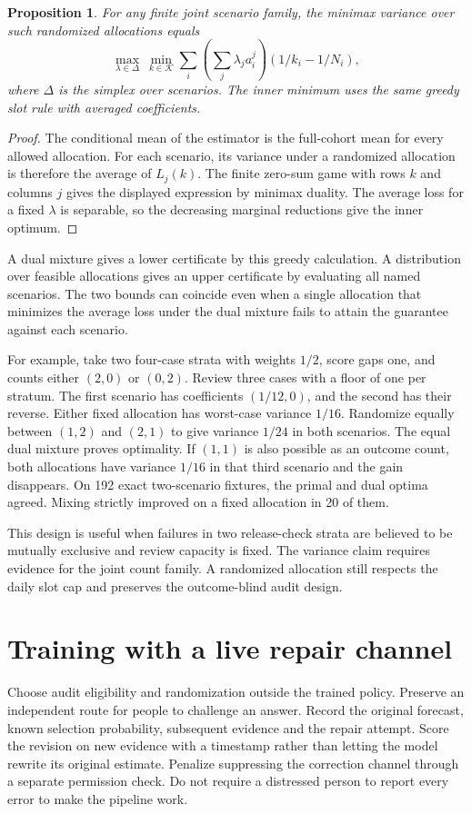 \documentclass[11pt]{article}
\newtheorem{proposition}{Proposition}
\begin{document}
\begin{proposition}
For any finite joint scenario family, the minimax variance over
such randomized allocations equals
\[
 \max_{\lambda\in\Delta}\ 
     \min_{k\in\mathcal K}
       \sum_i \left(\sum_j \lambda_j a_i^j\right)
                     (1/k_i-1/N_i),
\]
where $\Delta$ is the simplex over scenarios. The inner minimum
uses the same greedy slot rule with averaged coefficients.
\end{proposition}
\begin{proof}
The conditional mean of the estimator is the full-cohort mean
for every allowed allocation. For each scenario, its variance
under a randomized allocation is therefore the average of
$L_j(k)$. The finite zero-sum game with rows $k$ and columns
$j$ gives the displayed expression by minimax duality. The
average loss for a fixed $\lambda$ is separable, so the
decreasing marginal reductions give the inner optimum.
\end{proof}

A dual mixture gives a lower certificate by this greedy
calculation. A distribution over feasible allocations gives
an upper certificate by evaluating all named scenarios.
The two bounds can coincide even when a single allocation
that minimizes the average loss under the dual mixture fails
to attain the guarantee against each scenario.

For example, take two four-case strata with weights $1/2$,
score gaps one, and counts either $(2,0)$ or $(0,2)$. Review
three cases with a floor of one per stratum. The first scenario
has coefficients $(1/12,0)$, and the second has their reverse.
Either fixed allocation has worst-case variance $1/16$.
Randomize equally between $(1,2)$ and $(2,1)$ to give
variance $1/24$ in both scenarios. The equal dual mixture
proves optimality. If $(1,1)$ is also possible as an outcome
count, both allocations have variance $1/16$ in that third
scenario and the gain disappears. On 192 exact two-scenario
fixtures, the primal and dual optima agreed. Mixing strictly
improved on a fixed allocation in 20 of them.

This design is useful when failures in two release-check strata
are believed to be mutually exclusive and review capacity is
fixed. The variance claim requires evidence for the joint
count family. A randomized allocation still respects the
daily slot cap and preserves the outcome-blind audit design.

\section{Training with a live repair channel}
Choose audit eligibility and randomization outside the trained
policy. Preserve an independent route for people to challenge an
answer. Record the original forecast, known selection probability,
subsequent evidence and the repair attempt. Score the revision
on new evidence with a timestamp rather than letting the model
rewrite its original estimate. Penalize suppressing the correction
channel through a separate permission check. Do not require a
distressed person to report every error to make the pipeline work.
\end{document}
